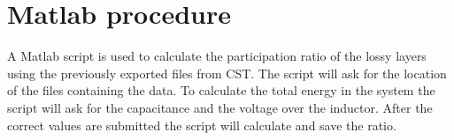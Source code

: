 \chapter{Matlab procedure}
\label{appendix:Matlab_procedure}
A Matlab script is used to calculate the participation ratio of the lossy layers using the previously exported files from CST. The script will ask for the location of the files containing the data. To calculate the total energy in the system the script will ask for the capacitance and the voltage over the inductor. After the correct values are submitted the script will calculate and save the ratio. 
